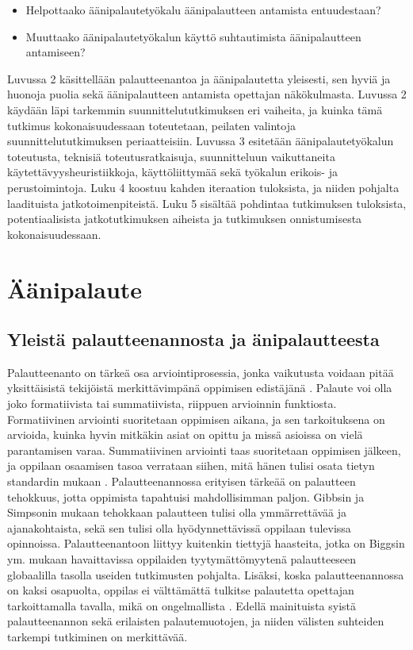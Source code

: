 \documentclass[utf8]{gradu3}
\begin{document}
\begin{itemize}
  \item Helpottaako äänipalautetyökalu äänipalautteen antamista entuudestaan?
  \item Muuttaako äänipalautetyökalun käyttö suhtautimista äänipalautteen antamiseen?
\end{itemize}

Luvussa 2 käsittellään palautteenantoa ja äänipalautetta yleisesti, sen hyviä ja huonoja puolia sekä äänipalautteen antamista opettajan näkökulmasta. Luvussa 2 käydään läpi tarkemmin suunnittelututkimuksen eri vaiheita, ja kuinka tämä tutkimus kokonaisuudessaan toteutetaan, peilaten valintoja suunnittelututkimuksen periaatteisiin. Luvussa 3 esitetään äänipalautetyökalun toteutusta, teknisiä toteutusratkaisuja, suunnitteluun vaikuttaneita käytettävyysheuristiikkoja, käyttöliittymää sekä työkalun erikois- ja perustoimintoja. Luku 4 koostuu kahden iteraation tuloksista, ja niiden pohjalta laadituista jatkotoimenpiteistä. Luku 5 sisältää pohdintaa tutkimuksen tuloksista, potentiaalisista jatkotutkimuksen aiheista ja tutkimuksen onnistumisesta kokonaisuudessaan. 

\chapter{Äänipalaute}

\section{Yleistä palautteenannosta ja änipalautteesta}

Palautteenanto on tärkeä osa arviointiprosessia, jonka vaikutusta voidaan pitää yksittäisistä tekijöistä merkittävimpänä oppimisen edistäjänä \parencite[][]{gibbs2004}. Palaute voi olla joko formatiivista tai summatiivista, riippuen arvioinnin funktiosta. Formatiivinen arviointi suoritetaan oppimisen aikana, ja sen tarkoituksena on arvioida, kuinka hyvin mitkäkin asiat on opittu ja missä asioissa on vielä parantamisen varaa. Summatiivinen arviointi taas suoritetaan oppimisen jälkeen, ja oppilaan osaamisen tasoa verrataan siihen, mitä hänen tulisi osata tietyn standardin mukaan \parencite[][]{biggs2011}. Palautteenannossa erityisen tärkeää on palautteen tehokkuus, jotta oppimista tapahtuisi mahdollisimman paljon. Gibbsin ja Simpsonin \parencite*[][]{gibbs2004} mukaan tehokkaan palautteen tulisi olla ymmärrettävää ja ajanakohtaista, sekä sen tulisi olla hyödynnettävissä oppilaan tulevissa opinnoissa. Palautteenantoon liittyy kuitenkin tiettyjä haasteita, jotka on Biggsin ym. \parencite*[][]{biggs2011} mukaan havaittavissa oppilaiden tyytymättömyytenä palautteeseen globaalilla tasolla useiden tutkimusten pohjalta. Lisäksi, koska palautteenannossa on kaksi osapuolta, oppilas ei välttämättä tulkitse palautetta opettajan tarkoittamalla tavalla, mikä on ongelmallista \parencite[][]{sadler2010}. Edellä mainituista syistä palautteenannon sekä erilaisten palautemuotojen, ja niiden välisten suhteiden tarkempi tutkiminen on merkittävää. 
\end{document}
